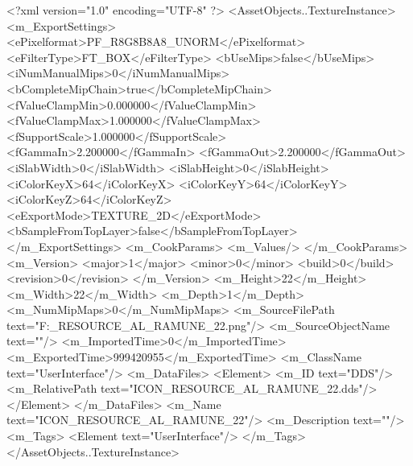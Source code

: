 <?xml version="1.0" encoding="UTF-8" ?>
<AssetObjects..TextureInstance>
	<m_ExportSettings>
		<ePixelformat>PF_R8G8B8A8_UNORM</ePixelformat>
		<eFilterType>FT_BOX</eFilterType>
		<bUseMips>false</bUseMips>
		<iNumManualMips>0</iNumManualMips>
		<bCompleteMipChain>true</bCompleteMipChain>
		<fValueClampMin>0.000000</fValueClampMin>
		<fValueClampMax>1.000000</fValueClampMax>
		<fSupportScale>1.000000</fSupportScale>
		<fGammaIn>2.200000</fGammaIn>
		<fGammaOut>2.200000</fGammaOut>
		<iSlabWidth>0</iSlabWidth>
		<iSlabHeight>0</iSlabHeight>
		<iColorKeyX>64</iColorKeyX>
		<iColorKeyY>64</iColorKeyY>
		<iColorKeyZ>64</iColorKeyZ>
		<eExportMode>TEXTURE_2D</eExportMode>
		<bSampleFromTopLayer>false</bSampleFromTopLayer>
	</m_ExportSettings>
	<m_CookParams>
		<m_Values/>
	</m_CookParams>
	<m_Version>
		<major>1</major>
		<minor>0</minor>
		<build>0</build>
		<revision>0</revision>
	</m_Version>
	<m_Height>22</m_Height>
	<m_Width>22</m_Width>
	<m_Depth>1</m_Depth>
	<m_NumMipMaps>0</m_NumMipMaps>
	<m_SourceFilePath text="F:\DT\lilyimages\resource\ICON_RESOURCE_AL_RAMUNE_22.png"/>
	<m_SourceObjectName text=""/>
	<m_ImportedTime>0</m_ImportedTime>
	<m_ExportedTime>999420955</m_ExportedTime>
	<m_ClassName text="UserInterface"/>
	<m_DataFiles>
		<Element>
			<m_ID text="DDS"/>
			<m_RelativePath text="ICON_RESOURCE_AL_RAMUNE_22.dds"/>
		</Element>
	</m_DataFiles>
	<m_Name text="ICON_RESOURCE_AL_RAMUNE_22"/>
	<m_Description text=""/>
	<m_Tags>
		<Element text="UserInterface"/>
	</m_Tags>
</AssetObjects..TextureInstance>

